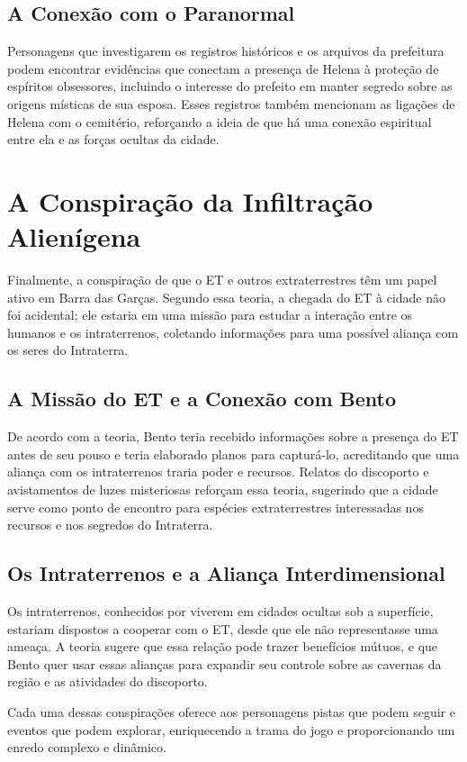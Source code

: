 \subsection{A Conexão com o Paranormal}
Personagens que investigarem os registros históricos e os arquivos da prefeitura podem encontrar evidências que conectam a presença de Helena à proteção de espíritos obsessores, incluindo o interesse do prefeito em manter segredo sobre as origens místicas de sua esposa. Esses registros também mencionam as ligações de Helena com o cemitério, reforçando a ideia de que há uma conexão espiritual entre ela e as forças ocultas da cidade.

\section{A Conspiração da Infiltração Alienígena}

Finalmente, a conspiração de que o ET e outros extraterrestres têm um papel ativo em Barra das Garças. Segundo essa teoria, a chegada do ET à cidade não foi acidental; ele estaria em uma missão para estudar a interação entre os humanos e os intraterrenos, coletando informações para uma possível aliança com os seres do Intraterra.

\subsection{A Missão do ET e a Conexão com Bento}
De acordo com a teoria, Bento teria recebido informações sobre a presença do ET antes de seu pouso e teria elaborado planos para capturá-lo, acreditando que uma aliança com os intraterrenos traria poder e recursos. Relatos do discoporto e avistamentos de luzes misteriosas reforçam essa teoria, sugerindo que a cidade serve como ponto de encontro para espécies extraterrestres interessadas nos recursos e nos segredos do Intraterra.

\subsection{Os Intraterrenos e a Aliança Interdimensional}
Os intraterrenos, conhecidos por viverem em cidades ocultas sob a superfície, estariam dispostos a cooperar com o ET, desde que ele não representasse uma ameaça. A teoria sugere que essa relação pode trazer benefícios mútuos, e que Bento quer usar essas alianças para expandir seu controle sobre as cavernas da região e as atividades do discoporto.

Cada uma dessas conspirações oferece aos personagens pistas que podem seguir e eventos que podem explorar, enriquecendo a trama do jogo e proporcionando um enredo complexo e dinâmico.

